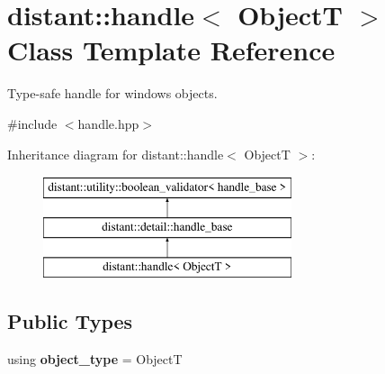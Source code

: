 \hypertarget{classdistant_1_1handle}{}\section{distant\+:\+:handle$<$ ObjectT $>$ Class Template Reference}
\label{classdistant_1_1handle}


Type-\/safe handle for windows objects.  




{\ttfamily \#include $<$handle.\+hpp$>$}

Inheritance diagram for distant\+:\+:handle$<$ ObjectT $>$\+:\begin{figure}[H]
\begin{center}
\leavevmode
\includegraphics[height=3.000000cm]{classdistant_1_1handle}
\end{center}
\end{figure}
\subsection*{Public Types}
\begin{DoxyCompactItemize}
\item 
\mbox{\label{classdistant_1_1handle_ad0687033839123a1babb00fd9d3735e9}} 
using {\bfseries object\+\_\+type} = ObjectT
\end{DoxyCompactItemize}
